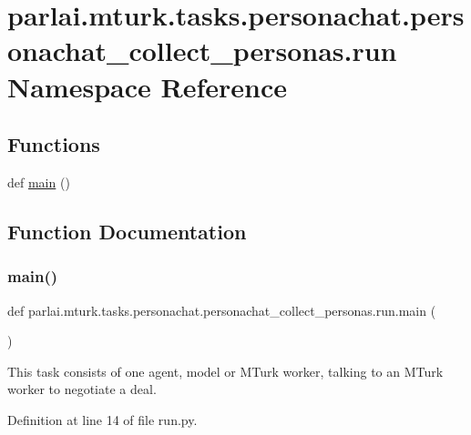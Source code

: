 \hypertarget{namespaceparlai_1_1mturk_1_1tasks_1_1personachat_1_1personachat__collect__personas_1_1run}{}\section{parlai.\+mturk.\+tasks.\+personachat.\+personachat\+\_\+collect\+\_\+personas.\+run Namespace Reference}
\label{namespaceparlai_1_1mturk_1_1tasks_1_1personachat_1_1personachat__collect__personas_1_1run}
\subsection*{Functions}
\begin{DoxyCompactItemize}
\item 
def \hyperlink{namespaceparlai_1_1mturk_1_1tasks_1_1personachat_1_1personachat__collect__personas_1_1run_a334f052cd3e8caffe3a2a4b7e4b668e2}{main} ()
\end{DoxyCompactItemize}


\subsection{Function Documentation}
\mbox{\label{namespaceparlai_1_1mturk_1_1tasks_1_1personachat_1_1personachat__collect__personas_1_1run_a334f052cd3e8caffe3a2a4b7e4b668e2}} 
\subsubsection{\texorpdfstring{main()}{main()}}
{\footnotesize\ttfamily def parlai.\+mturk.\+tasks.\+personachat.\+personachat\+\_\+collect\+\_\+personas.\+run.\+main (\begin{DoxyParamCaption}{ }\end{DoxyParamCaption})}

\begin{DoxyVerb}This task consists of one agent, model or MTurk worker, talking to an
MTurk worker to negotiate a deal.
\end{DoxyVerb}
 

Definition at line 14 of file run.\+py.

